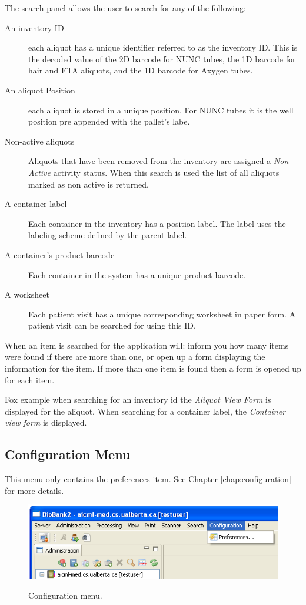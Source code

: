 The search panel allows the user to search for any of the following:
\begin{description}
  \item[An inventory ID] each aliquot has a unique identifier referred to as
    the inventory ID. This is the decoded value of the 2D barcode for NUNC
    tubes, the 1D barcode for hair and FTA aliquots, and the 1D barcode for
    Axygen tubes.
  \item[An aliquot Position] each aliquot is stored in a unique position. For
    NUNC tubes it is the well position pre appended with the pallet's labe.
  \item[Non-active aliquots] Aliquots that have been removed from the inventory
    are assigned a \emph{Non Active} activity status. When this search is used
    the list of all aliquots marked as non active is returned.
  \item[A container label] Each container in the inventory has a position
    label. The label uses the labeling scheme defined by the parent label.
  \item[A container's product barcode] Each container in the system has a
    unique product barcode.
  \item[A worksheet] Each patient visit has a unique corresponding worksheet in
    paper form. A patient visit can be searched for using this ID.
\end{description}
When an item is searched for the application will: inform you how many items
were found if there are more than one, or open up a form displaying the
information for the item. If more than one item is found then a form is opened
up for each item.

Fox example when searching for an inventory id the \emph{Aliquot View Form} is
displayed for the aliquot. When searching for a container label, the
\emph{Container view form} is displayed.

\subsection{Configuration Menu}
This menu only contains the preferences item. See Chapter
\ref{chap:configuration} for more details.
    \begin{figure}[H]
      \centering
      \scalebox{0.5}
      { \includegraphics*{screenshots/overview/main_menu_configuration} }
      \caption{Configuration menu.}
      \label{fig:main_menu_configuration}
    \end{figure}

